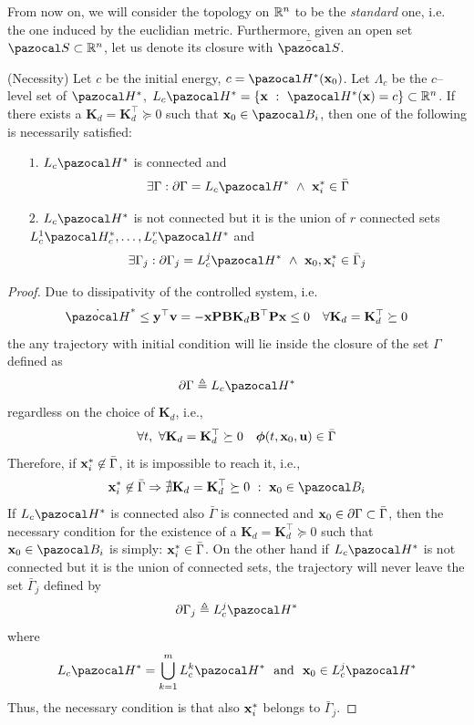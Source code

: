 From now on, we will consider the topology on $\mathbb{R}^n$ to be the \textit{standard} one, i.e. the one induced by the euclidian metric. Furthermore, given an open set $\Sa\subset\R^n$, let us denote its closure with $\bar{\Sa}$.
%
\begin{thm}(Necessity)\label{thm:necessity}
Let $c$ be the initial energy, $c = \Ha^*(\xb_0)$. Let $\Lambda_c$ be the $c$--level set of $\Ha^*$, $L_c\Ha^* = \{\xb~:~\Ha^*(\xb)=c\}\subset\R^n$. If there exists a $\mathbf{K}_d = \mathbf{K}_d^\top\succeq 0$ such that $\xb_0\in\B_i$, then one of the following is necessarily satisfied:
\begin{itemize}
    \item[$1.$] ${L}_c\Ha^*$ is connected and 
    \[\exists \Gamma:\partial \Gamma = L_c\Ha^* ~\land~ \xb_i^*\in \bar{\Gamma}\]
    \item[$2.$] $L_c\Ha^*$ is not connected but it is the union of $r$ connected sets $L_c^1\Ha^*_c,\dots,L_c^r\Ha^*$ and
    \[\exists {\Gamma}_j:\partial \Gamma_j = L_c^j\Ha^* ~\land~ \xb_0,\xb_i^*\in \Bar{\Gamma}_j\]
\end{itemize}
\end{thm}
%
\begin{proof}
Due to dissipativity of the controlled system, i.e.
%
\begin{equation}
    \dot{\Ha}^*\leq \yb^\top\vb =-\xb\Pb\Bb\mathbf{K}_d\Bb^\top\Pb\xb\leq 0 \quad\forall \mathbf{K}_d=\mathbf{K}_d^\top\succeq 0
\end{equation}
%
the any trajectory with initial condition will lie inside the closure of the set $\Gamma$ defined as 
%
\begin{equation}
    \partial \Gamma \triangleq {L}_c\Ha^*
\end{equation}
%
regardless on the choice of $\mathbf{K}_d$, i.e.,
%
\begin{equation}
    \forall t,~\forall \mathbf{K}_d=\mathbf{K}_d^\top\succeq 0\quad\bm\phi(t,\mathbf{x}_0,\mathbf{u})\in \bar{\Gamma}
\end{equation}
%
Therefore, if $\mathbf{x}_i^*\not\in\bar{\Gamma}$, it is impossible to reach it, i.e.,
%
\begin{equation}
    \xb_i^*\not\in\bar{\Gamma} \Rightarrow \nexists \mathbf{K}_d=\mathbf{K}_d^\top\succeq 0~:~\xb_0\in\B_i 
\end{equation}
%
If ${L}_c\Ha^*$ is connected also $\bar{\Gamma}$ is connected and $\mathbf{x}_0\in\partial \Gamma\subset \bar{\Gamma}$, then the necessary condition for the existence of a $\mathbf{K}_d=\mathbf{K}_d^\top\succeq 0$ such that $\xb_0\in\B_i$ is simply: $\mathbf{x}_i^*\in\bar{\Gamma}$. On the other hand if ${L}_c\Ha^*$ is not connected but it is the union of connected sets, the trajectory will never leave the set $\bar{\Gamma}_j$ defined by 
%
\begin{equation}
    \partial \Gamma_j \triangleq {L}_c^j\Ha^*
\end{equation}
%
where
\[{L}_c\Ha^* = \bigcup_{k = 1}^m{L}_c^k\Ha^*~~\text{and}~~\xb_0\in{L}_c^j\Ha^* \] 
Thus, the necessary condition is that also $\mathbf{x}_i^*$ belongs to $\bar{\Gamma}_j$.
\end{proof}
